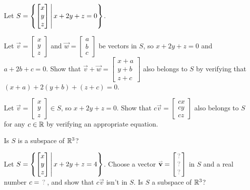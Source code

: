 \begin{applicationActivities}
\begin{activity}{15}
Let \(S=\left\{\begin{bmatrix} x \\ y \\ z \end{bmatrix}\,\middle|\, x+2y+z=0\right\}\).

\begin{subactivity}
  Let \(\vec{v}=\begin{bmatrix} x \\ y \\ z \end{bmatrix}\) and
  \(\vec{w} = \begin{bmatrix} a \\ b \\ c \end{bmatrix} \) be vectors in \(S\),
  so \(x+2y+z=0\) and \(a+2b+c=0\). Show that
  \(\vec v+\vec w = \begin{bmatrix} x+a \\ y+b \\ z+c \end{bmatrix}\)
  also belongs to \(S\) by verifying that \((x+a)+2(y+b)+(z+c)=0\).
\end{subactivity}
\begin{subactivity}
  Let \(\vec{v}=\begin{bmatrix} x \\ y \\ z \end{bmatrix}\in S\), so
  \(x+2y+z=0\). Show that \(c\vec v=\begin{bmatrix}cx\\cy\\cz\end{bmatrix}\) 
  also belongs to \(S\) for any \(c\in\mathbb{R}\) by verifying
  an appropriate equation.
\end{subactivity}
\begin{subactivity}
  Is \(S\) is a subspace of \(\mathbb{R}^3\)?
\end{subactivity}
\end{activity}

\begin{activity}{10}
Let \(S=\left\{\begin{bmatrix} x \\ y \\ z \end{bmatrix}\,\middle|\, x+2y+z=4\right\}\).
Choose a vector
\(\vec v=\begin{bmatrix} \unknown\\\unknown\\\unknown \end{bmatrix}\) in \(S\)
and a real number \(c=\unknown\), and show that \(c\vec v\) isn't in \(S\).
Is \(S\) a subspace of \(\mathbb{R}^3\)?
\end{activity}


\end{applicationActivities}
